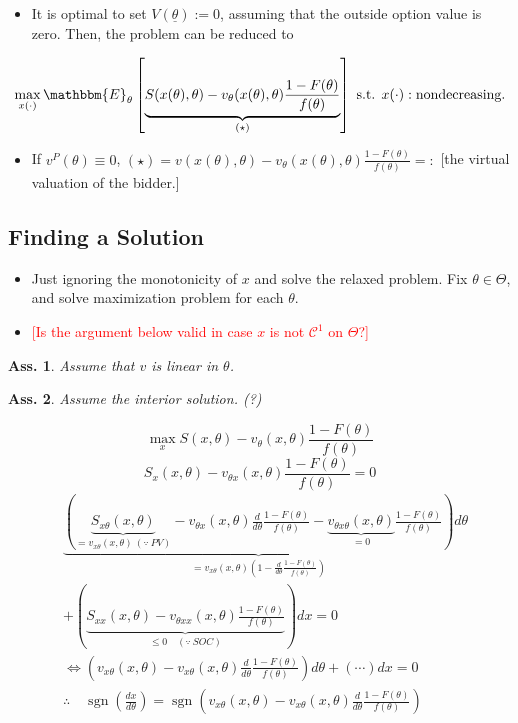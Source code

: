 \documentclass[11pt,a4paper,dvipdfmx]{article}
\theoremstyle{plain}
\newtheorem{ass}{Ass.}
\newcommand{\mC}{\mathcal{C}}
\newcommand{\equi}{\Longleftrightarrow}
\newcommand{\E}{\mathbbm{E}}
\newcommand{\1}{\mathbbm{1}}
\DeclareMathOperator{\sgn}{sgn}
\newcommand{\ocomment}[1]{{\textcolor{red}{#1}}}
\begin{document}
\begin{itemize}
	\item It is optimal to set $V(\underline{\theta}) := 0$, assuming that the outside option value is zero. Then, the problem can be reduced to
\end{itemize}
\[
\max_{x(\cdot)}
\E_\theta \left[
	\underbrace{S(x(\theta), \theta)
	- v_\theta(x(\theta), \theta) \frac{1 - F(\theta)}{f(\theta)}
	}_{(\star)}
	\right]
\text{ s.t. }
x(\cdot): \text{nondecreasing.}
\]
\begin{itemize}
	\item If $v^P(\theta) \equiv 0$,
	$(\star) = v(x(\theta), \theta)
	- v_\theta(x(\theta), \theta) \frac{1 - F(\theta)}{f(\theta)}
	=:$ [the virtual valuation of the bidder.]
\end{itemize}

\subsection*{Finding a Solution}
\begin{itemize}
	\item Just ignoring the monotonicity of $x$ and solve the relaxed problem. Fix $\theta \in \Theta$, and solve maximization problem for each $\theta$.
	\item \ocomment{[Is the argument below valid in case $x$ is not $\mC^1$ on $\Theta$?]}
\end{itemize}
\begin{ass}
	Assume that $v$ is linear in $\theta$.
\end{ass}
\begin{ass}
	Assume the interior solution. (?)
\end{ass}
\[
\max_x S(x, \theta) - v_\theta(x, \theta) \frac{1 - F(\theta)}{f(\theta)}
\]
\begin{equation}
	S_{x}(x, \theta) - v_{\theta x}(x, \theta) \frac{1 - F(\theta)}{f(\theta)} = 0  \tag{FOC}
\end{equation}
\begin{align*}
	&\underbrace{
	\left(
	\underbrace{
	S_{x\theta}(x, \theta)
	}_{= v_{x\theta}(x, \theta) \ (\because \ PV)}
	- v_{\theta x}(x, \theta) \frac{d}{d\theta}\frac{1 - F(\theta)}{f(\theta)}
	- \underbrace{
	v_{\theta x \theta}(x, \theta)}_{=0}
	\frac{1 - F(\theta)}{f(\theta)}
	\right)
	}_{= v_{x\theta}(x, \theta) \left(1 - \frac{d}{d\theta}\frac{1 - F(\theta)}{f(\theta)} \right)}
	d\theta \\
	&+
	\left(
	\underbrace{
	S_{xx}(x, \theta)
	- v_{\theta xx}(x, \theta) \frac{1 - F(\theta)}{f(\theta)}
	}_{\leq 0 \quad (\because \ SOC)}
	\right) dx
	= 0 \\
	&\equi
	\left( v_{x\theta}(x, \theta)  - v_{x\theta}(x, \theta) \frac{d}{d\theta}\frac{1 - F(\theta)}{f(\theta)} \right) d\theta + (\cdots)dx = 0 \\
	&\therefore \quad \sgn \left( \frac{dx}{d\theta} \right) = \sgn\left( v_{x\theta}(x, \theta)  - v_{x\theta}(x, \theta) \frac{d}{d\theta}\frac{1 - F(\theta)}{f(\theta)} \right) 
\end{align*}
\end{document}
